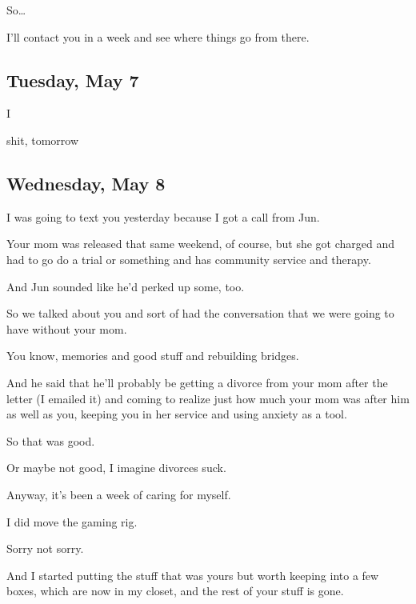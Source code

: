 {
So\ldots{}

I'll contact you in a week and see
where things go from there.

\newpage

\subsection*{Tuesday, May 7}\label{tuesday-may-7}

I

shit, tomorrow

\newpage

\subsection*{Wednesday, May 8}\label{wednesday-may-8}

I was going to text you yesterday
because I got a call from Jun.

Your mom was released that same
weekend, of course, but she got charged and had to go do a trial or
something and has community service and therapy.

And Jun sounded like he'd perked up
some, too.

So we talked about you and sort of
had the conversation that we were going to have without your mom.

You know, memories and good stuff
and rebuilding bridges.

And he said that he'll probably be
getting a divorce from your mom after the letter (I emailed it) and
coming to realize just how much your mom was after him as well as you,
keeping you in her service and using anxiety as a tool.

So that was good.

Or maybe not good, I imagine
divorces suck.

Anyway, it's been a week of caring
for myself.

I did move the gaming rig.

Sorry not sorry.

And I started putting the stuff that
was yours but worth keeping into a few boxes, which are now in my
closet, and the rest of your stuff is gone.

}
